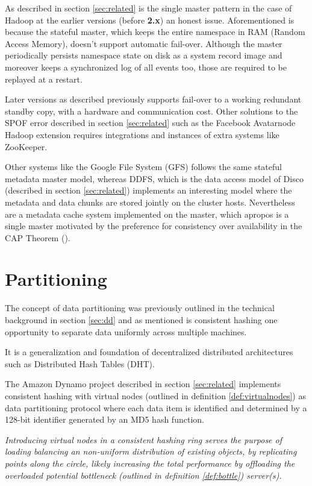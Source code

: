 As described in section \ref{sec:related} is the single master pattern in the case of Hadoop at the earlier versions (before \textbf{2.x}) an honest issue. Aforementioned is because the stateful master, which keeps the entire namespace in RAM (Random Access Memory), doesn't support automatic fail-over. Although the master periodically persists namespace state on disk as a system record image and moreover keeps a synchronized log of all events too, those are required to be replayed at a restart.

Later versions as described previously supports fail-over to a working redundant standby copy, with a hardware and communication cost. Other solutions to the SPOF error described in section \ref{sec:related} such as the Facebook Avatarnode Hadoop extension requires integrations and instances of extra systems like ZooKeeper.
\newline

Other systems like the Google File System (GFS) follows the same stateful metadata master model, whereas DDFS, which is the data access model of Disco (described in section \ref{sec:related}) implements an interesting model where the metadata and data chunks are stored jointly on the cluster hosts. Nevertheless are a metadata cache system implemented on the master, which apropos is a single master motivated by the preference for consistency over availability in the CAP Theorem ().

\section{Partitioning} \label{sec:partitioning}
The concept of data partitioning was previously outlined in the technical background in section \ref{sec:dd} and as mentioned is consistent hashing one opportunity to separate data uniformly across multiple machines. 

It is a generalization and foundation of decentralized distributed architectures such as Distributed Hash Tables (DHT). 
\newline

The Amazon Dynamo project described in section \ref{sec:related} implements consistent hashing with virtual nodes (outlined in definition \ref{def:virtualnodes}) as data partitioning protocol where each data item is identified and determined by a 128-bit identifier generated by an MD5 hash function.
\vspace*{3mm}

\begin{definition} \label{def:virtualnodes}
\textit{Introducing virtual nodes in a consistent hashing ring serves the purpose of loading balancing an non-uniform distribution of existing objects, by replicating points along the circle, likely increasing the total performance by offloading the overloaded potential bottleneck (outlined in definition \ref{def:bottle}) server(s).}
\end{definition}
\vspace*{3mm}

